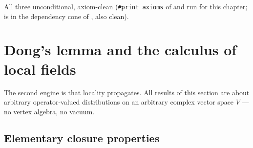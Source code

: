 \begin{status}
All three unconditional, axiom-clean (\texttt{\#print axioms} of
 and  run for this chapter;
 is in the dependency cone of , also clean).
\end{status}

\section{Dong's lemma and the calculus of local fields}\label{l03:sec:dong}

The second engine is that locality propagates. All results of this section are about arbitrary
operator-valued distributions on an arbitrary complex vector space $V$ --- no vertex algebra, no
vacuum.

\subsection{Elementary closure properties}

